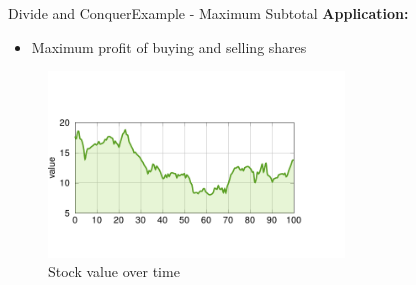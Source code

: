    


\begin{frame}{Divide and Conquer}{Example - Maximum Subtotal}
  \textbf{Application:}
  \begin{itemize}
    \item
      Maximum profit of buying and selling shares
  \end{itemize}
  \begin{figure}
    \begin{adjustbox}{width=\linewidth}
%      
    \includegraphics[width=0.7\textwidth]{Images/DivideAndConquer/shares-graph.pdf}
    \end{adjustbox}
    \caption{Stock value over time}
    \label{fig:divide_and_conquer:shares_value}
  \end{figure}
\end{frame}

